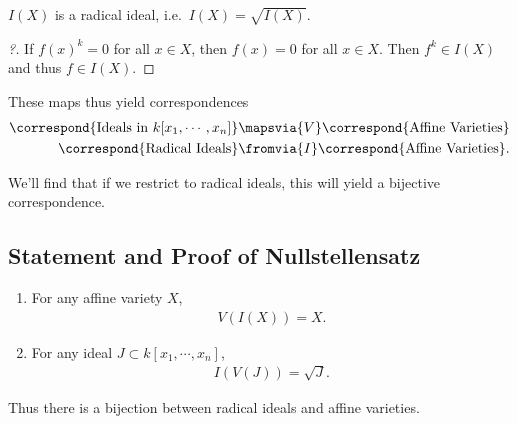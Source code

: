 \begin{proposition}

\(I(X)\) is a radical ideal, i.e.~\(I(X) = \sqrt{I(X)}\).

\end{proposition}

\begin{proof}[?]

If \(f(x)^k = 0\) for all \(x\in X\), then \(f(x) = 0\) for all
\(x\in X\). Then \(f^k \in I(X)\) and thus \(f\in I(X)\).

\end{proof}

These maps thus yield correspondences
\begin{align*}  
\correspond{\text{Ideals in } k[x_1, \cdots, x_n]} &\mapsvia{V} \correspond{\text{Affine Varieties}} \\
\correspond{\text{Radical Ideals}} &\fromvia{I} \correspond{\text{Affine Varieties}}
.\end{align*}

We'll find that if we restrict to radical ideals, this will yield a
bijective correspondence.

\hypertarget{statement-and-proof-of-nullstellensatz}{%
\subsection{Statement and Proof of
Nullstellensatz}\label{statement-and-proof-of-nullstellensatz}}

\begin{theorem}

\envlist

\begin{enumerate}
\def\labelenumi{\alph{enumi}.}
\item
  For any affine variety \(X\),
  \begin{align*}
  V(I(X)) = X
  .\end{align*}
\item
  For any ideal \(J \subset k[x_1, \cdots, x_n]\),
  \begin{align*}
  I(V(J)) = \sqrt{J}
  .\end{align*}
\end{enumerate}

Thus there is a bijection between radical ideals and affine varieties.

\end{theorem}

